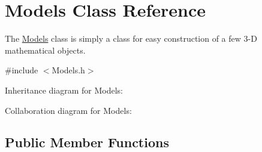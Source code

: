 \hypertarget{class_models}{}\section{Models Class Reference}
\label{class_models}


The \hyperlink{class_models}{Models} class is simply a class for easy construction of a few 3-\/D mathematical objects.  




{\ttfamily \#include $<$Models.\+h$>$}



Inheritance diagram for Models\+:


Collaboration diagram for Models\+:
\subsection*{Public Member Functions}
